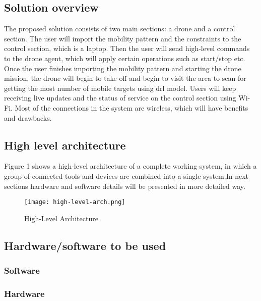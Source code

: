 \documentclass[../main.tex]{subfiles}
\begin{document}
\subsection{Solution overview}

The proposed solution consists of two main sections: a drone and a control section. The user will import
the mobility pattern and the constraints to the control section, which is a laptop. Then the user will send high-level commands to the drone agent, which will apply certain operations such as start/stop etc. Once the user finishes importing the mobility pattern and starting the drone mission, the drone will begin to take off and begin to visit the area to scan for getting the most number of mobile targets using \gls{drl} model. Users will keep receiving live updates and the status of service on the control section using Wi-Fi. Most of the connections in the system are wireless, which will have benefits and drawbacks.


\subsection{High level architecture}
Figure 1 shows a high-level architecture of a complete working system, in which a group of connected tools and devices are combined into a single system.In next sections hardware and software details will be presented in more detailed way.
\begin{figure}[H]
	\centering
	\texttt{[image: high-level-arch.png]}
	\caption{High-Level Architecture}\label{fig1:arch-fig}
\end{figure}


\subsection{Hardware/software to be used}

\subsubsection{Software}

\subsubsection{Hardware}
\end{document}
